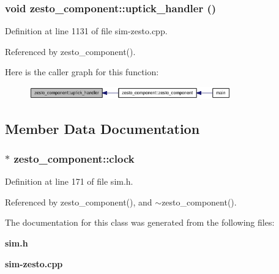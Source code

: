 \subsubsection[{uptick\_\-handler}]{\setlength{\rightskip}{0pt plus 5cm}void zesto\_\-component::uptick\_\-handler ()}\label{classzesto__component_bbdcf4496a9d0615bc45f0ad227c91cb}




Definition at line 1131 of file sim-zesto.cpp.

Referenced by zesto\_\-component().

Here is the caller graph for this function:\nopagebreak
\begin{figure}[H]
\begin{center}
\leavevmode
\includegraphics[width=247pt]{classzesto__component_bbdcf4496a9d0615bc45f0ad227c91cb_icgraph}
\end{center}
\end{figure}


\subsection{Member Data Documentation}
\subsubsection[{clock}]{$\ast$ {\bf zesto\_\-component::clock}}\label{classzesto__component_0c9ac1d333819314935e52e9748f1139}




Definition at line 171 of file sim.h.

Referenced by zesto\_\-component(), and $\sim$zesto\_\-component().

The documentation for this class was generated from the following files:\begin{CompactItemize}
\item 
{\bf sim.h}\item 
{\bf sim-zesto.cpp}\end{CompactItemize}
